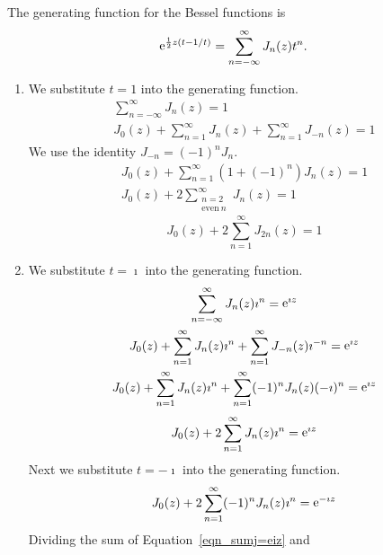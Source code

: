 {%
\begin{Solution}
  The generating function for the Bessel functions is
  \begin{equation} 
    \label{gen_fcn_bessel}
    \mathop{\mathrm{e}}\nolimits^{\frac{1}{2} z (t - 1/t)} = \sum_{n = -\infty}^\infty J_n(z) t^n.
  \end{equation}

  \begin{enumerate}
  \item
    We substitute $t = 1$ into the generating function.
    \begin{gather*}
      \sum_{n = -\infty}^\infty J_n(z) = 1 
      \\
      J_0(z) + \sum_{n = 1}^\infty J_n(z) + \sum_{n = 1}^\infty J_{-n}(z) = 1
    \end{gather*}
    We use the identity $J_{-n} = (-1)^n J_n$.
    \begin{gather*}
      J_0(z) + \sum_{n = 1}^\infty \left( 1 + (-1)^n \right) J_n(z) = 1 
      \\
      J_0(z) + 2 \sum_{\substack{n = 2 \\ \mathrm{even}\ n}}^\infty J_n(z) = 1
    \end{gather*}
    \[
    \boxed{
      J_0(z) + 2 \sum_{n = 1}^\infty J_{2n}(z) = 1
      }
    \]
  \item
    We substitute $t = \imath$ into the generating function.
    \begin{gather*}
      \sum_{n = -\infty}^\infty J_n(z) \imath^n = \mathop{\mathrm{e}}\nolimits^{\imath z} 
      \\
      J_0(z) + \sum_{n = 1}^\infty J_n(z) \imath^n + \sum_{n = 1}^\infty J_{-n}(z) \imath^{-n} = \mathop{\mathrm{e}}\nolimits^{\imath z} 
      \\
      J_0(z) + \sum_{n = 1}^\infty J_n(z) \imath^n + \sum_{n = 1}^\infty (-1)^n J_n(z) (-\imath)^n = \mathop{\mathrm{e}}\nolimits^{\imath z} 
    \end{gather*}
    \begin{equation}
      \label{eqn_sumj=eiz}
      J_0(z) + 2 \sum_{n = 1}^\infty J_n(z) \imath^n = \mathop{\mathrm{e}}\nolimits^{\imath z} 
    \end{equation}
    Next we substitute $t = - \imath$ into the generating function.
    \begin{equation}
      \label{eqn_sumj=e-iz}
      J_0(z) + 2 \sum_{n = 1}^\infty (-1)^n J_n(z) \imath^n = \mathop{\mathrm{e}}\nolimits^{- \imath z} 
    \end{equation}
    Dividing the sum of Equation~\ref{eqn_sumj=eiz} and 

\end{enumerate}
\end{Solution}}
